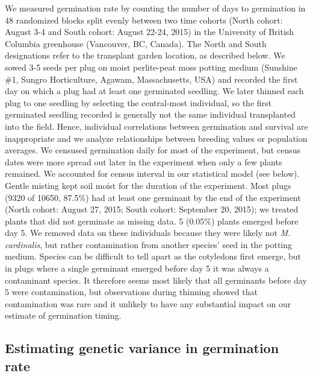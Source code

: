 \documentclass[
  12pt,
]{article}
\begin{document}
We measured germination rate by counting the number of days to germination in 48 randomized blocks split evenly between two time cohorts (North cohort: August 3-4 and South cohort: August 22-24, 2015) in the University of British Columbia greenhouse (Vancouver, BC, Canada). The North and South designations refer to the transplant garden location, as described below. We sowed 3-5 seeds per plug on moist perlite-peat moss potting medium (Sunshine \#1, Sungro Horticulture, Agawam, Massachusetts, USA) and recorded the first day on which a plug had at least one germinated seedling. We later thinned each plug to one seedling by selecting the central-most individual, so the first germinated seedling recorded is generally not the same individual transplanted into the field. Hence, individual correlations between germination and survival are inappropriate and we analyze relationships between breeding values or population averages. We censused germination daily for most of the experiment, but census dates were more spread out later in the experiment when only a few plants remained. We accounted for census interval in our statistical model (see below). Gentle misting kept soil moist for the duration of the experiment. Most plugs (9320 of 10650, 87.5\%) had at least one germinant by the end of the experiment (North cohort: August 27, 2015; South cohort: September 20, 2015); we treated plants that did not germinate as missing data. 5 (0.05\%) plants emerged before day 5. We removed data on these individuals because they were likely not \emph{M. cardinalis}, but rather contamination from another species' seed in the potting medium. Species can be difficult to tell apart as the cotyledons first emerge, but in plugs where a single germinant emerged before day 5 it was always a contaminant species. It therefore seems most likely that all germinants before day 5 were contamination, but observations during thinning showed that contamination was rare and it unlikely to have any substantial impact on our estimate of germination timing.

\hypertarget{estimating-genetic-variance-in-germination-rate}{%
\subsection{Estimating genetic variance in germination rate}\label{estimating-genetic-variance-in-germination-rate}}
\end{document}

